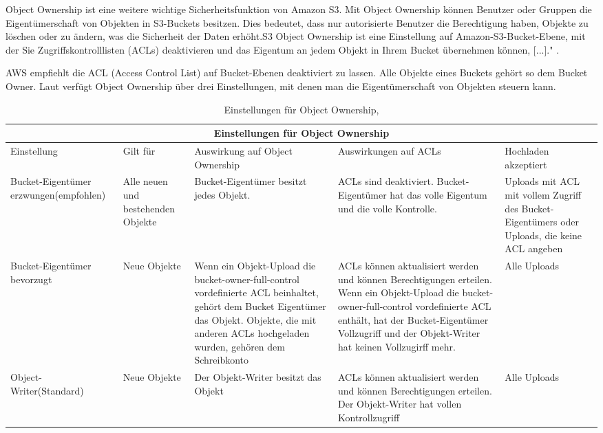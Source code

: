 Object Ownership ist eine weitere wichtige Sicherheitsfunktion von Amazon S3. Mit Object Ownership können Benutzer oder Gruppen die Eigentümerschaft von Objekten in S3-Buckets besitzen. Dies bedeutet, dass nur autorisierte Benutzer die Berechtigung haben, Objekte zu löschen oder zu ändern, was die Sicherheit der Daten erhöht.\glqq S3 Object Ownership ist eine Einstellung auf Amazon-S3-Bucket-Ebene, mit der Sie Zugriffskontrolllisten (ACLs) deaktivieren und das Eigentum an jedem Objekt in Ihrem Bucket übernehmen können, [...]." \cite{aws-iam-s3}.

\newpage

AWS empfiehlt die ACL (Access Control List) auf Bucket-Ebenen deaktiviert zu lassen. Alle Objekte eines Buckets gehört so dem Bucket Owner. Laut \citeauthor{aws-iam-s3} verfügt Object Ownership über drei Einstellungen, mit denen man die Eigentümerschaft von Objekten steuern kann.

\begin{table}[!h]
\begin{tabular}{ |p{2.5cm}|p{2cm}|p{3cm}|p{3cm}|p{3cm}| }
\hline
\multicolumn{5}{|c|}{Einstellungen für Object Ownership} \\
\hline
Einstellung & Gilt für & Auswirkung auf Object Ownership & Auswirkungen auf ACLs & Hochladen akzeptiert \\
\hline
\cline{1-5}
Bucket-Eigentümer erzwungen(empfohlen) & Alle neuen und bestehenden Objekte & Bucket-Eigentümer besitzt jedes Objekt. & ACLs sind deaktiviert. Bucket-Eigentümer hat das volle Eigentum und die volle Kontrolle. & Uploads mit ACL mit vollem Zugriff des Bucket-Eigentümers oder Uploads, die keine ACL angeben \\
\cline{1-5}
Bucket-Eigentümer bevorzugt & Neue Objekte   & Wenn ein Objekt-Upload die bucket-owner-full-control vordefinierte ACL beinhaltet, gehört dem Bucket Eigentümer das Objekt. Objekte, die mit anderen ACLs hochgeladen wurden, gehören dem Schreibkonto & ACLs können aktualisiert werden und können Berechtigungen erteilen. Wenn ein Objekt-Upload die bucket-owner-full-control vordefinierte ACL enthält, hat der Bucket-Eigentümer Vollzugriff und der Objekt-Writer hat keinen Vollzugirff mehr. & Alle Uploads \\
\cline{1-5}
Object-Writer(Standard) & Neue Objekte & Der Objekt-Writer besitzt das Objekt & ACLs können aktualisiert werden und können Berechtigungen erteilen. Der Objekt-Writer hat vollen Kontrollzugriff & Alle Uploads \\
\cline{1-5}
\end{tabular}
\caption{Einstellungen für Object Ownership, }
\end{table}


